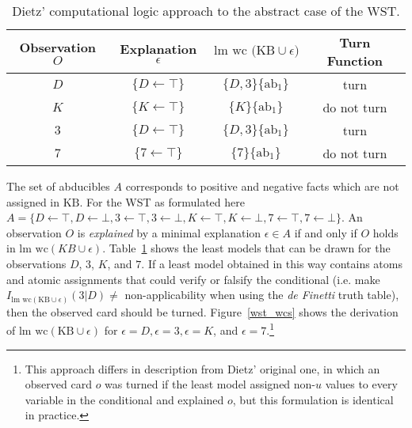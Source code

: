 \begin{table}
\begin{center}


\begin{tabular}{ c c c c }
  \textbf{Observation $O$}&  \textbf{Explanation $\epsilon$}&\textbf{$\text{lm wc (KB}\cup \epsilon)$}& \textbf{Turn Function} \\ 
  \hline
 $D$ & $\{D\leftarrow \top\}$ & $\{D,3\}\{\text{ab}_1\}$&turn\\  
 $K$ & $\{K\leftarrow \top\}$ & $\{K\}\{\text{ab}_1\}$&do not turn\\  
 $3$ & $\{D\leftarrow\top\}$ &$\{D,3\}\{\text{ab}_1\}$&turn\\
 $7$ & $\{7 \leftarrow \top\}$ & $\{7\}\{\text{ab}_1\}$&do not turn
\end{tabular}
\caption{Dietz' computational logic approach to the abstract case of the WST.}
\label{tbl:wst_lmwc}
\end{center}
\end{table}

The set of abducibles $A$ corresponds to positive and negative facts which are not assigned in $\text{KB}$. For the WST as formulated here $A=\{D\leftarrow \top,D\leftarrow \bot,3\leftarrow \top,3\leftarrow \bot,K\leftarrow \top,K\leftarrow \bot,7\leftarrow \top,7\leftarrow \bot\}$.
 An observation $O$ is \textit{explained} by a minimal explanation $\epsilon \in A$ if and only if $O$ holds in $\textrm{lm wc}(KB\cup\epsilon)$. Table~\ref{tbl:wst_lmwc} shows the least models that can be drawn for the observations $D$, $3$, $K$, and $7$. If a least model obtained in this way contains atoms and atomic assignments that could verify or falsify the conditional (i.e. make $I_{\textrm{lm wc}(\text{KB}\cup \epsilon)}(3|D)\neq$ non-applicability when using the \textit{de Finetti} truth table), then the observed card should be turned. Figure~\ref{wst_wcs} shows the derivation of $\textrm{lm wc}(\text{KB}\cup \epsilon)$ for $\epsilon=D, \epsilon=3, \epsilon=K$, and $\epsilon=7$.\footnote{This approach differs in description from Dietz' original one, in which an observed card $o$ was turned if the least model assigned non-$u$ values to every variable in the conditional and explained $o$, but this formulation is identical in practice.}


